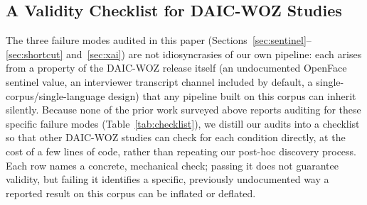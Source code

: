 \documentclass[journal]{IEEEtran}
\begin{document}
\subsection{A Validity Checklist for DAIC-WOZ Studies}
\label{sec:checklist}

The three failure modes audited in this paper (Sections~\ref{sec:sentinel}--\ref{sec:shortcut}
and~\ref{sec:xai}) are not idiosyncrasies of our own pipeline: each
arises from a property of the DAIC-WOZ release itself (an
undocumented OpenFace sentinel value, an interviewer transcript
channel included by default, a single-corpus/single-language design)
that any pipeline built on this corpus can inherit silently. Because
none of the prior work surveyed above reports auditing for these
specific failure modes (Table~\ref{tab:checklist}), we distill our
audits into a checklist so that other DAIC-WOZ studies can check for
each condition directly, at the cost of a few lines of code, rather
than repeating our post-hoc discovery process. Each row names a
concrete, mechanical check; passing it does not guarantee validity,
but failing it identifies a specific, previously undocumented way a
reported result on this corpus can be inflated or deflated.
\end{document}
